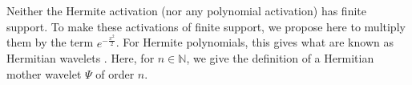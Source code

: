 \documentclass{article} %
\theoremstyle{plain}
\theoremstyle{definition}
\theoremstyle{remark}
\begin{document}




Neither the Hermite activation (nor any polynomial activation) has finite support. To make these activations of finite support, we propose here to multiply them by the term $e^{-\frac{x^2}{2}}$. For Hermite polynomials, this gives what are known as Hermitian wavelets \cite{brackx2008hermitian, pandey2020continuous}. Here, for $n \in \mathbb{N}$, we give the definition of a Hermitian mother wavelet $\Psi$ of order $n$.
\end{document}
